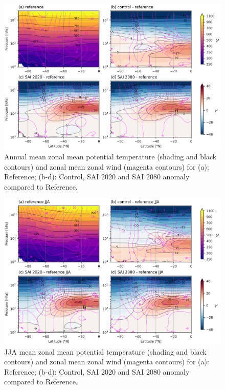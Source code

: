 \begin{figure}[H]
	\centering
	\includegraphics[width=0.95\linewidth]{images/th_U_zmdiff_ann.png}
	\caption{Annual mean zonal mean potential temperature (shading and black contours) and zonal mean zonal wind (magenta contours) for (a): Reference; (b-d): Control, SAI 2020 and SAI 2080 anomaly compared to Reference.}
	\label{fig:th_U_zmdiff_ann}
\end{figure}

\begin{figure}[H]
	\centering
	\includegraphics[width=0.95\linewidth]{images/th_U_zmdiff_JJA.png}
	\caption{JJA mean zonal mean potential temperature (shading and black contours) and zonal mean zonal wind (magenta contours) for (a): Reference; (b-d): Control, SAI 2020 and SAI 2080 anomaly compared to Reference.}
	\label{fig:th_U_zmdiff_JJA}
\end{figure}

